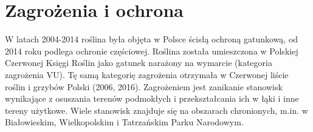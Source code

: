 \documentclass{beamer}
\begin{document}
\section{Zagrożenia i ochrona}
\begin{frame}
W latach 2004-2014 roślina była objęta w Polsce ścisłą ochroną gatunkową, od 2014 roku podlega ochronie częściowej. Roślina została umieszczona w Polskiej Czerwonej Księgi Roślin jako gatunek narażony na wymarcie (kategoria zagrożenia VU). Tę samą kategorię zagrożenia otrzymała w Czerwonej liście roślin i grzybów Polski (2006, 2016). Zagrożeniem jest zanikanie stanowisk wynikające z osuszania terenów podmokłych i przekształcania ich w łąki i inne tereny użytkowe. Wiele stanowisk znajduje się na obszarach chronionych, m.in. w Białowieskim, Wielkopolskim i Tatrzańskim Parku Narodowym.
\end{frame}
\end{document}
